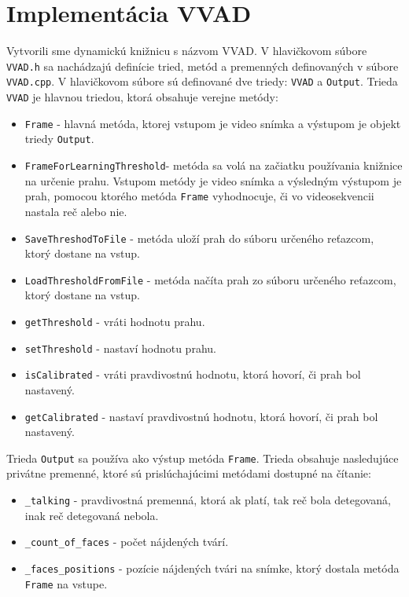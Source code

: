 \section{Implementácia VVAD}
Vytvorili sme dynamickú knižnicu s názvom VVAD. 
V hlavičkovom súbore \texttt{VVAD.h} sa nachádzajú definície tried, metód a premenných definovaných v súbore \texttt{VVAD.cpp}.
V hlavičkovom súbore sú definované dve triedy: \texttt{VVAD} a  \texttt{Output}.
Trieda \texttt{VVAD} je hlavnou triedou, ktorá obsahuje verejne metódy:
\begin{itemize}
\item \texttt{Frame} - hlavná metóda, ktorej vstupom je video snímka a výstupom je objekt triedy \texttt{Output}.
\item \texttt{Fra\-me\-For\-Lear\-ning\-Threshold}- metóda sa volá na začiatku používania knižnice na určenie prahu. Vstupom metódy je video snímka a výsledným výstupom je prah, pomocou ktorého metóda \texttt{Frame} vyhodnocuje, či vo videosekvencii nastala reč alebo nie.
\item \texttt{SaveThreshodToFile} - metóda uloží prah do súboru určeného reťazcom, ktorý dostane na vstup.
\item \texttt{LoadThresholdFromFile} -  metóda načíta prah zo súboru určeného reťazcom, ktorý dostane na vstup.
\item \texttt{getThreshold} - vráti hodnotu prahu.
\item \texttt{setThreshold} - nastaví hodnotu prahu.
\item \texttt{isCalibrated} - vráti pravdivostnú hodnotu, ktorá hovorí, či prah bol nastavený.
\item \texttt{getCalibrated} - nastaví pravdivostnú hodnotu, ktorá hovorí, či prah bol nastavený.
\end{itemize}

Trieda  \texttt{Output} sa používa ako výstup metóda  \texttt{Frame}. Trieda obsahuje nasledujúce privátne premenné, ktoré sú prislúchajúcimi metódami dostupné na čítanie:
\begin{itemize}
\item \texttt{\_talking} - pravdivostná premenná, ktorá ak platí, tak reč bola detegovaná, inak reč detegovaná nebola.
\item \texttt{\_count\_of\_faces} - počet nájdených tvárí.
\item \texttt{\_faces\_positions} - pozície nájdených tvári na snímke, ktorý dostala metóda \texttt{Frame} na vstupe.
\end{itemize}

